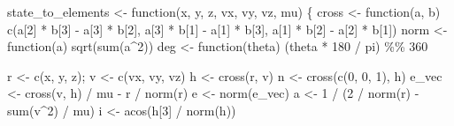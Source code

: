\documentclass[
  10.5pt,
  letterpaper,
]{scrbook}
\newenvironment{Shaded}{\begin{snugshade}}{\end{snugshade}}
\newcommand{\ControlFlowTok}[1]{\textcolor[rgb]{0.00,0.00,0.00}{#1}}
\newcommand{\DecValTok}[1]{\textcolor[rgb]{0.00,0.00,0.00}{#1}}
\newcommand{\FunctionTok}[1]{\textcolor[rgb]{0.00,0.00,0.00}{#1}}
\newcommand{\NormalTok}[1]{\textcolor[rgb]{0.00,0.00,0.00}{#1}}
\newcommand{\OtherTok}[1]{\textcolor[rgb]{0.00,0.00,0.00}{#1}}
\newcommand{\SpecialCharTok}[1]{\textcolor[rgb]{0.00,0.00,0.00}{#1}}
\theoremstyle{definition}
\theoremstyle{plain}
\theoremstyle{remark}
\begin{document}
\begin{Shaded}
\begin{Highlighting}[]
\NormalTok{state\_to\_elements }\OtherTok{\textless{}{-}} \ControlFlowTok{function}\NormalTok{(x, y, z, vx, vy, vz, mu) \{}
\NormalTok{  cross }\OtherTok{\textless{}{-}} \ControlFlowTok{function}\NormalTok{(a, b) }\FunctionTok{c}\NormalTok{(a[}\DecValTok{2}\NormalTok{] }\SpecialCharTok{*}\NormalTok{ b[}\DecValTok{3}\NormalTok{] }\SpecialCharTok{{-}}\NormalTok{ a[}\DecValTok{3}\NormalTok{] }\SpecialCharTok{*}\NormalTok{ b[}\DecValTok{2}\NormalTok{],}
\NormalTok{                            a[}\DecValTok{3}\NormalTok{] }\SpecialCharTok{*}\NormalTok{ b[}\DecValTok{1}\NormalTok{] }\SpecialCharTok{{-}}\NormalTok{ a[}\DecValTok{1}\NormalTok{] }\SpecialCharTok{*}\NormalTok{ b[}\DecValTok{3}\NormalTok{],}
\NormalTok{                            a[}\DecValTok{1}\NormalTok{] }\SpecialCharTok{*}\NormalTok{ b[}\DecValTok{2}\NormalTok{] }\SpecialCharTok{{-}}\NormalTok{ a[}\DecValTok{2}\NormalTok{] }\SpecialCharTok{*}\NormalTok{ b[}\DecValTok{1}\NormalTok{])}
\NormalTok{  norm  }\OtherTok{\textless{}{-}} \ControlFlowTok{function}\NormalTok{(a) }\FunctionTok{sqrt}\NormalTok{(}\FunctionTok{sum}\NormalTok{(a}\SpecialCharTok{\^{}}\DecValTok{2}\NormalTok{))}
\NormalTok{  deg   }\OtherTok{\textless{}{-}} \ControlFlowTok{function}\NormalTok{(theta) (theta }\SpecialCharTok{*} \DecValTok{180} \SpecialCharTok{/}\NormalTok{ pi) }\SpecialCharTok{\%\%} \DecValTok{360}

\NormalTok{  r }\OtherTok{\textless{}{-}} \FunctionTok{c}\NormalTok{(x, y, z); v }\OtherTok{\textless{}{-}} \FunctionTok{c}\NormalTok{(vx, vy, vz)}
\NormalTok{  h }\OtherTok{\textless{}{-}} \FunctionTok{cross}\NormalTok{(r, v)}
\NormalTok{  n }\OtherTok{\textless{}{-}} \FunctionTok{cross}\NormalTok{(}\FunctionTok{c}\NormalTok{(}\DecValTok{0}\NormalTok{, }\DecValTok{0}\NormalTok{, }\DecValTok{1}\NormalTok{), h)}
\NormalTok{  e\_vec }\OtherTok{\textless{}{-}} \FunctionTok{cross}\NormalTok{(v, h) }\SpecialCharTok{/}\NormalTok{ mu }\SpecialCharTok{{-}}\NormalTok{ r }\SpecialCharTok{/} \FunctionTok{norm}\NormalTok{(r)}
\NormalTok{  e }\OtherTok{\textless{}{-}} \FunctionTok{norm}\NormalTok{(e\_vec)}
\NormalTok{  a }\OtherTok{\textless{}{-}} \DecValTok{1} \SpecialCharTok{/}\NormalTok{ (}\DecValTok{2} \SpecialCharTok{/} \FunctionTok{norm}\NormalTok{(r) }\SpecialCharTok{{-}} \FunctionTok{sum}\NormalTok{(v}\SpecialCharTok{\^{}}\DecValTok{2}\NormalTok{) }\SpecialCharTok{/}\NormalTok{ mu)}
\NormalTok{  i }\OtherTok{\textless{}{-}} \FunctionTok{acos}\NormalTok{(h[}\DecValTok{3}\NormalTok{] }\SpecialCharTok{/} \FunctionTok{norm}\NormalTok{(h))}


\end{Highlighting}
\end{Shaded}
\end{document}
